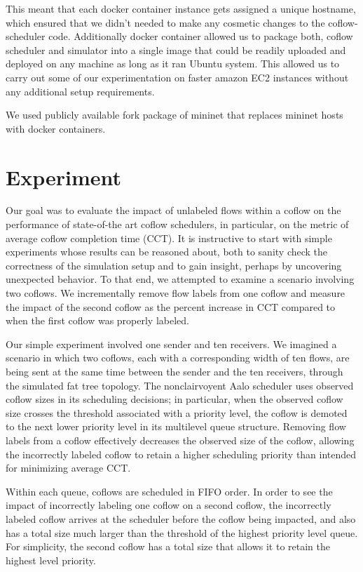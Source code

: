 \documentclass[conference]{IEEEtran}
\begin{document}
This meant that each docker container instance gets assigned a unique hostname, which ensured that we didn't needed to make any cosmetic changes to the coflow-scheduler code. Additionally  docker container allowed us to package both, coflow scheduler and simulator into a single image that could be readily uploaded and deployed on any machine as long as it ran Ubuntu system. This allowed us to carry out some of our experimentation on faster amazon EC2 instances without any additional setup requirements.

We used publicly available fork package of mininet \cite{dockernet} that replaces mininet hosts with docker containers.

\section{Experiment}

Our goal was to evaluate the impact of unlabeled flows within a coflow on the performance of state-of-the art coflow schedulers, in particular, on the metric of average coflow completion time (CCT). It is instructive to start with simple experiments whose results can be reasoned about, both to sanity check the correctness of the simulation setup and to gain insight, perhaps by uncovering unexpected behavior. 
To that end, we attempted to examine a scenario involving two coflows. We incrementally remove flow labels from one coflow and measure the impact of the second coflow as the percent increase in CCT compared to when the first coflow was properly labeled.

Our simple experiment involved one sender and ten receivers. We imagined a scenario in which two coflows, each with a corresponding width of ten flows, are being sent at the same time between the sender and the ten receivers, through the simulated fat tree topology. The nonclairvoyent Aalo scheduler uses observed coflow sizes in its scheduling decisions; in particular, when the observed coflow size crosses the threshold associated with a priority level, the coflow is demoted to the next lower priority level in its multilevel queue structure. Removing flow labels from a coflow effectively decreases the observed size of the coflow, allowing the incorrectly labeled coflow to retain a higher scheduling priority than intended for minimizing average CCT.

Within each queue, coflows are scheduled in FIFO order. In order to see the impact of incorrectly labeling one coflow on a second coflow, the incorrectly labeled coflow arrives at the scheduler before the coflow being impacted, and also has a total size much larger than the threshold of the highest priority level queue. For simplicity, the second coflow has a total size that allows it to retain the highest level priority.
\end{document}
